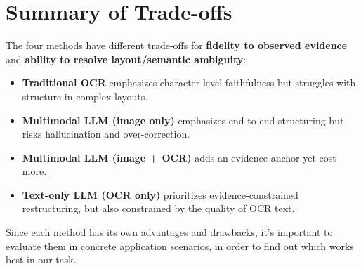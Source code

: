\section{Summary of Trade-offs}
The four methods have different trade-offs for \textbf{fidelity to observed evidence} and \textbf{ability to resolve layout/semantic ambiguity}:
\begin{itemize}
    \item \textbf{Traditional OCR} emphasizes character-level faithfulness but struggles with structure in complex layouts.
    \item \textbf{Multimodal LLM (image only)} emphasizes end-to-end structuring but risks hallucination and over-correction.
    \item \textbf{Multimodal LLM (image + OCR)} adds an evidence anchor yet cost more.
    \item \textbf{Text-only LLM (OCR only)} prioritizes evidence-constrained restructuring, but also constrained by the quality of OCR text.
\end{itemize}

Since each method has its own advantages and drawbacks, it's important to evaluate them in concrete application scenarios, in order to find out which works best in our task.


